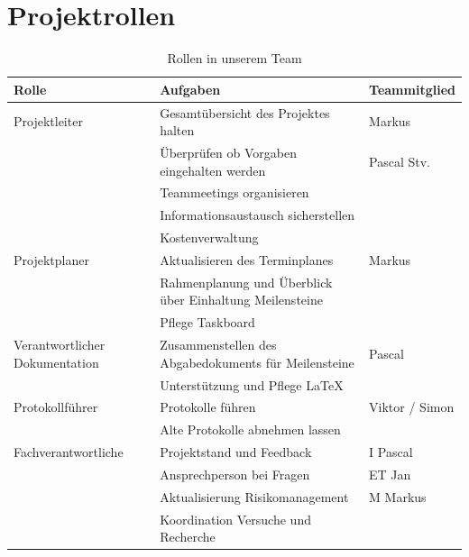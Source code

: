 \documentclass[a4paper]{report}
\begin{document}
\newpage

\section{Projektrollen}
\label{sec:ProjektRollen}
\begin{table}[h!]
	\begin{tabular}{|p{}|p{}|p{}|}
		\hline
		\textbf{Rolle} & \textbf{Aufgaben} & \textbf{Teammitglied} \\
		\hline
		Projektleiter & Gesamtübersicht des Projektes halten  & Markus \\
		& Überprüfen ob Vorgaben eingehalten werden & Pascal Stv. \\
		& Teammeetings organisieren & \\
		& Informationsaustausch sicherstellen & \\
		& Kostenverwaltung & \\
		\hline
		Projektplaner & Aktualisieren des Terminplanes & Markus\\
		& Rahmenplanung und Überblick über Einhaltung Meilensteine& \\
		& Pflege Taskboard & \\
		\hline
		Verantwortlicher Dokumentation& Zusammenstellen des Abgabedokuments für Meilensteine & Pascal \\
		& Unterstützung und Pflege LaTeX &  \\
		\hline
		Protokollführer & Protokolle führen & Viktor / Simon \\
		& Alte Protokolle abnehmen lassen & \\
		\hline
		Fachverantwortliche & Projektstand und Feedback & I Pascal \\
		& Ansprechperson bei Fragen & ET Jan\\
		& Aktualisierung Risikomanagement & M Markus\\
		& Koordination Versuche und Recherche & \\
		\hline
	\end{tabular}
	\caption{Rollen in unserem Team}
	\label{tab:Projektrollen}
\end{table}
\end{document}
